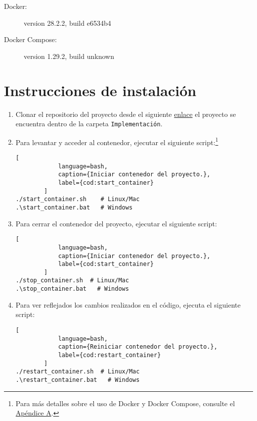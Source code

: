 	\begin{description}
		\item[Docker:] version 28.2.2, build e6534b4
		\item[Docker Compose:] version 1.29.2, build unknown
	\end{description}

	\section{Instrucciones de instalaci\'on}
	\label{sec:instalacion}

	\begin{enumerate}
		\item Clonar el repositorio del proyecto desde el siguiente \href{https://github.com/Ic3manMtz/Servicio-Social.git}{enlace} el proyecto se encuentra dentro de la carpeta \texttt{Implementaci\'on}.
		
		\item Para levantar y acceder al contenedor, ejecutar el siguiente script:\footnote{Para más detalles sobre el uso de Docker y Docker Compose, consulte el \hyperref[anexo:docker]{Apéndice A}.}
		\begin{lstlisting}[
			language=bash,
			caption={Iniciar contenedor del proyecto.},
			label={cod:start_container}
		]
./start_container.sh	# Linux/Mac
.\start_container.bat	# Windows
		\end{lstlisting}

		\item Para cerrar el contenedor del proyecto, ejecutar el siguiente script:
		\begin{lstlisting}[
			language=bash,
			caption={Iniciar contenedor del proyecto.},
			label={cod:start_container}
		]
./stop_container.sh  # Linux/Mac
.\stop_container.bat   # Windows
		\end{lstlisting}

		\item Para ver reflejados los cambios realizados en el código, ejecuta el siguiente script:
		\begin{lstlisting}[
			language=bash,
			caption={Reiniciar contenedor del proyecto.},
			label={cod:restart_container}
		]
./restart_container.sh  # Linux/Mac
.\restart_container.bat   # Windows
		\end{lstlisting}
	\end{enumerate}